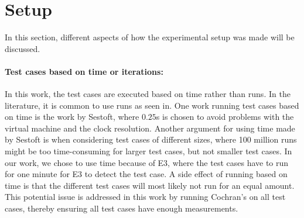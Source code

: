 \section{Setup}

In this section, different aspects of how the experimental setup was made will be discussed.

\paragraph*{Test cases based on time or iterations:} In this work, the test cases are executed based on time rather than runs. In the literature, it is common to use runs as seen in\cite[]{Pereira2017,Koedijk2022diff,Georgiou2020}. One work running test cases based on time is the work by Sestoft\cite[]{sestoft2013microbenchmarks}, where $0.25$s is chosen to avoid problems with the virtual machine and the clock resolution. Another argument for using time made by Sestoft\cite[]{sestoft2013microbenchmarks} is when considering test cases of different sizes, where 100 million runs might be too time-consuming for larger test cases, but not smaller test cases. In our work, we chose to use time because of E3, where the test cases have to run for one minute for E3 to detect the test case. A side effect of running based on time is that the different test cases will most likely not run for an equal amount. This potential issue is addressed in this work by running Cochran's on all test cases, thereby ensuring all test cases have enough measurements. 



